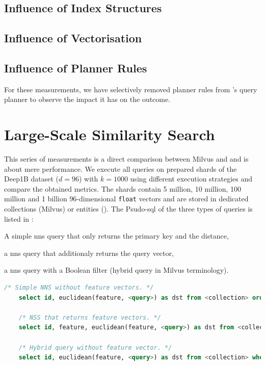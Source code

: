 \subsection{Influence of Index Structures}

\subsection{Influence of Vectorisation}

\subsection{Influence of Planner Rules}

For these measurements, we have selectively removed planner rules from \cottontail's query planner to observe the impact it has on the outcome.


\section{Large-Scale Similarity Search}
This series of measurements is a direct comparison between Milvus and \cottontail{} and is about mere performance. We execute all queries on prepared shards of the Deep1B \cite{Babenko:2016Efficient} dataset ($d=96$) with $k=1000$ using different execution strategies and compare the obtained metrics. The shards contain 5 million, 10 million, 100 million and 1 billion $96$-dimensional \texttt{float} vectors and are stored in dedicated collections (Milvus) or entities (\cottontail). The Psudo-\acrshort{sql} of the three types of queries is listed in :
\begin{enumerate*}[label=(\roman*)]
    \item A simple \acrshort{nns} query that only returns the primary key and the distance,
    \item a \acrshort{nns} query that additionaly returns the query vector,
    \item a \acrshort{nns} query with a Boolean filter (hybrid query in Milvus terminology).
\end{enumerate*}

\begin{lstlisting}[language=SQL, caption={Pseudo-SQL of the queries executed for this measurement.}, label=listing:big_nns_query, numbers=none]
    /* Simple NNS without feature vectors. */
    select id, euclidean(feature, <query>) as dst from <collection> order by dst limit 1000
    
    /* NSS that returns feature vectors. */
    select id, feature, euclidean(feature, <query>) as dst from <collection> order by dst limit 1000

    /* Hybrid query without feature vector. */
    select id, euclidean(feature, <query>) as dst from <collection> where category = <category> order by dst limit 1000
\end{lstlisting}

